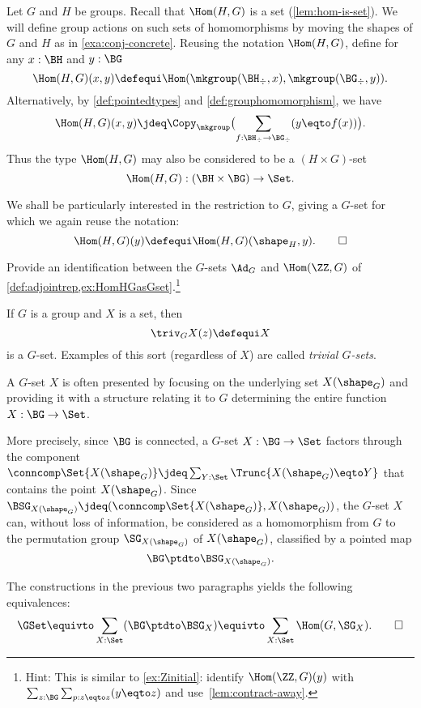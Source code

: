 \begin{example}
  \label{ex:HomHGasGset}
  Let $G$ and $H$ be groups. Recall that $\Hom(H,G)$ is a set
  (\cref{lem:hom-is-set}). We will define group actions on such
  sets of homomorphisms by moving the shapes of $G$ and $H$ as
  in \cref{exa:conj-concrete}. Reusing the notation
  $\Hom(H,G)$, define for any $x:\BH$ and $y:\BG$
  \[
    \Hom(H,G)(x,y)\defequi \Hom(\mkgroup(\BH_\div,x),\mkgroup(\BG_\div,y)).
  \]
  Alternatively, by \cref{def:pointedtypes} and
  \cref{def:grouphomomorphism}, we have
  \[
    \Hom(H,G)(x,y)\jdeq
    \Copy_{\mkgroup}\bigl(\sum_{f:\BH_\div\to \BG_\div}(y\eqto f(x))\bigr).
  \]
  Thus the type $\Hom(H,G)$ may also be considered to be a $(H\times G)$-set
  \[
    \Hom(H,G) : (\BH\times \BG)\to\Set.
  \]
  
  We shall be particularly interested in the restriction to $G$,
  giving a $G$-set for which we again reuse the notation:
  \[
    \Hom(H,G)(y)\defequi\Hom(H,G)(\shape_H,y) %
    .\qedhere
  \]
\end{example}
\begin{xca}
  \label{xca:HomZGvsAdG}
  Provide an identification between the $G$-sets
  $\Ad_G$  and $\Hom(\ZZ,G)$
  of \cref{def:adjointrep,ex:HomHGasGset}.\footnote{%
    Hint: This is similar to \cref{ex:Zinitial}:
    identify $\Hom(\ZZ,G)(y)$ with $\sum_{z:\BG}\sum_{p:z\eqto z}(y \eqto z)$
    and use~\cref{lem:contract-away}.}
\end{xca}

\begin{example}\label{def:trivGset}
  If $G$ is a group and $X$ is a set, then
  \[\triv_G X(z)\defequi X\]
  is a $G$-set.
  Examples of this sort (regardless of $X$) are called \emph{trivial $G$-sets}.
\end{example}

\begin{remark}
  \label{remark:GsetsareGsets}
  A $G$-set $X$ is often presented by focusing on the underlying set $X(\shape_G)$
  and providing it with a structure relating it to $G$ determining
  the entire function $X : \BG\to\Set$.

  More precisely, since $\BG$ is connected, a $G$-set $X : \BG\to\Set$ factors
  through the component
  $\conncomp \Set {X(\shape_G)} \jdeq \sum_{Y:\Set}\Trunc{X(\shape_G) \eqto Y}$
  that contains the point $X(\shape_G)$.
  Since $\BSG_{X(\shape_G)}\jdeq(\conncomp \Set {X(\shape_G)},X(\shape_G))$,
  the $G$-set $X$ can,
  without loss of information, be considered as a homomorphism from $G$ to
  the permutation group $\SG_{X(\shape_G)}$ of $X(\shape_G)$,
  classified by a pointed map
  \[
    \BG\ptdto\BSG_{X(\shape_G)}.
  \]

  The constructions in the previous two paragraphs yields the following equivalences:
  \[
    \GSet \equivto \sum_{X:\Set} (\BG \ptdto \BSG_X)
     \equivto \sum_{X:\Set}\Hom(G,\SG_X).\qedhere
   \]
\end{remark}


